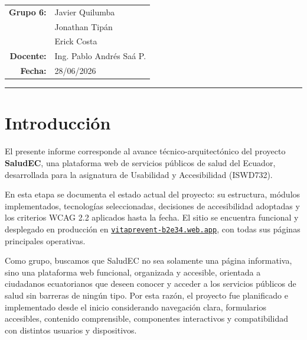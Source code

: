 \documentclass[12pt, a4paper]{article}
\begin{document}
\begin{titlepage}
\vspace{0.8cm}
\begin{tabular}{@{}rl@{}}
  \textbf{\color{navydeep}Grupo 6:} & Javier Quilumba \\
  & Jonathan Tipán \\
  & Erick Costa \\[8pt]
  \textbf{\color{navydeep}Docente:} & Ing. Pablo Andrés Saá P. \\[4pt]
  \textbf{\color{navydeep}Fecha:}   & 28/06/2026 \\
\end{tabular}

\vspace{1cm}
{\color{royalblue}\rule{0.85\linewidth}{1.5pt}}

\end{titlepage}

\newpage
{}
\tableofcontents

\newpage
{}

\section{Introducción}

El presente informe corresponde al avance técnico-arquitectónico del proyecto \textbf{SaludEC}, una plataforma web de servicios públicos de salud del Ecuador, desarrollada para la asignatura de Usabilidad y Accesibilidad (ISWD732).

En esta etapa se documenta el estado actual del proyecto: su estructura, módulos implementados, tecnologías seleccionadas, decisiones de accesibilidad adoptadas y los criterios WCAG 2.2 aplicados hasta la fecha. El sitio se encuentra funcional y desplegado en producción en \href{https://vitaprevent-b2e34.web.app}{\texttt{vitaprevent-b2e34.web.app}}, con todas sus páginas principales operativas.

Como grupo, buscamos que SaludEC no sea solamente una página informativa, sino una plataforma web funcional, organizada y accesible, orientada a ciudadanos ecuatorianos que deseen conocer y acceder a los servicios públicos de salud sin barreras de ningún tipo. Por esta razón, el proyecto fue planificado e implementado desde el inicio considerando navegación clara, formularios accesibles, contenido comprensible, componentes interactivos y compatibilidad con distintos usuarios y dispositivos.
\end{document}
